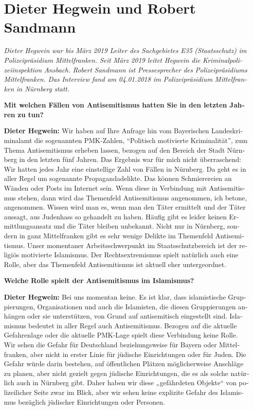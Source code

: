 \section{Dieter Hegwein und Robert Sandmann}
\begin{otherlanguage}{ngerman}
\textit{Dieter Hegwein war bis März 2019 Leiter des Sachgebietes E35 (Staatsschutz) im Polizeipräsidium Mittelfranken. Seit März 2019 leitet Hegwein die Kriminalpolizeiinspektion Ansbach. Robert Sandmann ist Pressesprecher des Polizeipräsidiums Mittelfranken.
Das Interview fand am 04.01.2018 im Polizeipräsidium Mittelfranken in Nürnberg statt.
}\par 
\vspace*{2em}
\textbf{Mit welchen Fällen von Antisemitismus hatten Sie in den letzten Jahren zu tun?}

\textbf{Dieter Hegwein:} Wir haben auf Ihre Anfrage hin vom Bayerischen Landeskriminalamt die sogenannten PMK-Zahlen, ``Politisch motivierte Kriminalität'', zum Thema Antisemitismus erheben lassen, bezogen auf den Bereich der Stadt Nürnberg in den letzten fünf Jahren. Das Ergebnis war für mich nicht überraschend: Wir hatten jedes Jahr eine einstellige Zahl von Fällen in Nürnberg. Da geht es in aller Regel um sogenannte Propagandadelikte. Das können Schmierereien an Wänden oder Posts im Internet sein. Wenn diese in Verbindung mit Antisemitismus stehen, dann wird das Themenfeld Antisemitismus angenommen, ich betone, angenommen. Wissen wird man es, wenn man den Täter ermittelt und der Täter aussagt, aus Judenhass so gehandelt zu haben. Häufig gibt es leider keinen Ermittlungsansatz und die Täter bleiben unbekannt. Nicht nur in Nürnberg, sondern in ganz Mittelfranken gibt es sehr wenige Delikte im Themenfeld Antisemitismus. Unser momentaner Arbeitsschwerpunkt im Staatsschutzbereich ist der religiös motivierte Islamismus. Der Rechtsextremismus spielt natürlich auch eine Rolle, aber das Themenfeld Antisemitismus ist aktuell eher untergeordnet. 

\textbf{Welche Rolle spielt der Antisemitismus im Islamismus?}

\textbf{Dieter Hegwein:} Bei uns momentan keine. Es ist klar, dass islamistische Gruppierungen, Organisationen und auch die Islamisten, die diesen Gruppierungen anhängen oder sie unterstützen, von Grund auf antisemitisch eingestellt sind. Islamismus bedeutet in aller Regel auch Antisemitismus. Bezogen auf die aktuelle Gefahrenlage oder die aktuelle PMK-Lage spielt diese Verbindung keine Rolle. Wir sehen die Gefahr für Deutschland beziehungsweise für Bayern oder Mittelfranken, aber nicht in erster Linie für jüdische Einrichtungen oder für Juden. Die Gefahr würde darin bestehen, auf öffentlichen Plätzen möglicherweise Anschläge zu planen, aber nicht gezielt gegen jüdische Einrichtungen, die es als solche natürlich auch in Nürnberg gibt. Daher haben wir diese „gefährdeten Objekte“ von polizeilicher Seite zwar im Blick, aber wir sehen keine explizite Gefahr des Islamismus bezüglich jüdischer Einrichtungen oder Personen.


\end{otherlanguage}
